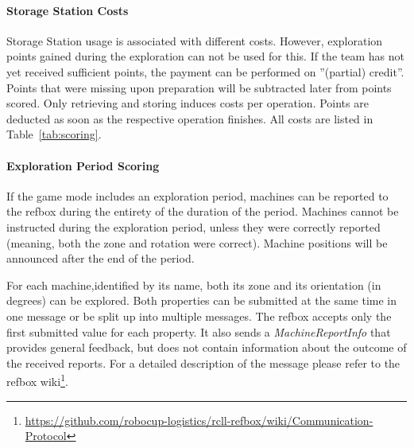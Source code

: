 \documentclass[12pt,twoside]{article}
\newcommand{\reftab}[1]{Table~\ref{#1}}
\begin{document}
\paragraph{Storage Station Costs}
Storage Station usage is associated with different costs.
However, exploration points gained during the exploration can not be
used for this. If the team has not yet received sufficient points,
the payment can be performed on ''(partial) credit''. Points that %
were missing upon preparation will be subtracted later from points scored.
Only retrieving and storing induces costs per operation.
Points are deducted as soon as the respective operation finishes.
All costs are listed in \reftab{tab:scoring}.

\paragraph{Exploration Period Scoring}
If the game mode includes an exploration period, machines
can be reported to the \ac{refbox} during the entirety of the duration of the
period.
Machines cannot be instructed during the exploration period, unless they were
correctly reported (meaning, both the zone and rotation were correct).
Machine positions will be announced after the end of the period.

For each machine,identified by its name, both its zone and its orientation
(in degrees) can be explored.
Both properties can be submitted at the same time in one message or be split up
into multiple messages.
The \ac{refbox} accepts only the first submitted value for each property.
It also sends a \textit{MachineReportInfo} that provides general feedback,
but does not contain information about the outcome of the received reports.
For a detailed description of the message please refer to the \ac{refbox}
wiki\footnote{\url{https://github.com/robocup-logistics/rcll-refbox/wiki/Communication-Protocol}}. %
\end{document}
